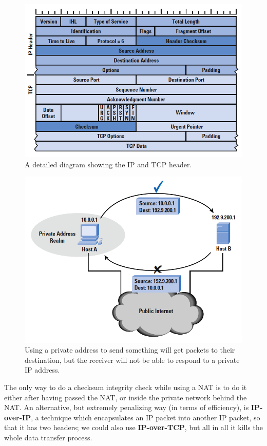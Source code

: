 \begin{figure}[h]
    \centering
    \includegraphics[scale=0.6]{img/ip_header.png}
    \decoRule
    \caption{A detailed diagram showing the IP and TCP header.}
    \label{fig:ip_header}
\end{figure}

\begin{figure}[H]
    \centering
    \includegraphics[scale=0.6]{img/nat_basic.png}
    \decoRule
    \caption{Using a private address to send something will get packets to their destination, but the receiver will not be able to respond to a private IP address.}
    \label{fig:nat_basic}
\end{figure}

The only way to do a checksum integrity check while using a NAT is to do it either after having passed the NAT, or inside the private network behind the NAT. An alternative, but extremely penalizing way (in terms of efficiency), is \textbf{IP-over-IP}, a technique which encapsulates an IP packet into another IP packet, so that it has two headers; we could also use \textbf{IP-over-TCP}, but all in all it kills the whole data transfer process.


